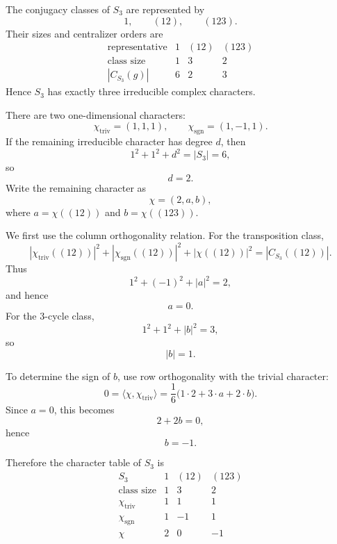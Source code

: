 \begin{example}
    The conjugacy classes of \(S_3\) are represented by
    \[
        1,\qquad (12),\qquad (123).
    \]
    Their sizes and centralizer orders are
    \[
        \begin{array}{c|ccc}
            \text{representative} & 1 & (12) & (123)\\
            \hline
            \text{class size} & 1 & 3 & 2\\
            |C_{S_3}(g)| & 6 & 2 & 3
        \end{array}
    \]
    Hence \(S_3\) has exactly three irreducible complex characters.

    There are two one-dimensional characters:
    \[
        \chi_{\mathrm{triv}}=(1,1,1),
        \qquad
        \chi_{\mathrm{sgn}}=(1,-1,1).
    \]
    If the remaining irreducible character has degree \(d\), then
    \[
        1^2+1^2+d^2=|S_3|=6,
    \]
    so
    \[
        d=2.
    \]
    Write the remaining character as
    \[
        \chi=(2,a,b),
    \]
    where \(a=\chi((12))\) and \(b=\chi((123))\).

    We first use the column orthogonality relation. For the transposition class,
    \[
        |\chi_{\mathrm{triv}}((12))|^2
        +
        |\chi_{\mathrm{sgn}}((12))|^2
        +
        |\chi((12))|^2
        =
        |C_{S_3}((12))|.
    \]
    Thus
    \[
        1^2+(-1)^2+|a|^2=2,
    \]
    and hence
    \[
        a=0.
    \]
    For the \(3\)-cycle class,
    \[
        1^2+1^2+|b|^2=3,
    \]
    so
    \[
        |b|=1.
    \]

    To determine the sign of \(b\), use row orthogonality with the trivial character:
    \[
        0=\langle \chi,\chi_{\mathrm{triv}}\rangle
        =
        \frac{1}{6}
        \bigl(
            1\cdot 2
            +
            3\cdot a
            +
            2\cdot b
        \bigr).
    \]
    Since \(a=0\), this becomes
    \[
        2+2b=0,
    \]
    hence
    \[
        b=-1.
    \]

    Therefore the character table of \(S_3\) is
    \[
        \begin{array}{c|ccc}
            S_3 & 1 & (12) & (123)\\
            \hline
            \text{class size} & 1 & 3 & 2\\
            \hline
            \chi_{\mathrm{triv}} & 1 & 1 & 1\\
            \chi_{\mathrm{sgn}} & 1 & -1 & 1\\
            \chi & 2 & 0 & -1
        \end{array}
    \]
\end{example}

